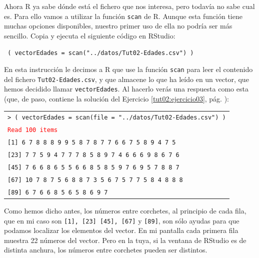 \documentclass[10pt,a4paper]{article}\usepackage[]{graphicx}\usepackage[]{color}
\newcounter {cont01}
\begin{document}
%

Ahora R ya sabe dónde está el fichero que nos interesa, pero todavía no sabe cual es. Para ello vamos a utilizar la función {\tt scan} de R. Aunque esta función tiene muchas opciones disponibles, nuestro primer uso de ella no podría ser más sencillo. Copia y ejecuta el siguiente código en RStudio:
\begin{center}
\begin{minipage}{10cm}
{\tt
( vectorEdades = scan("../datos/Tut02-Edades.csv") )
}
\end{minipage}
\end{center}
En esta instrucción le decimos a R que use la función {\tt scan} para leer el contenido del fichero {\tt Tut02-Edades.csv}, y que almacene lo que ha leído en un vector, que hemos decidido llamar {\tt vectorEdades}.
Al hacerlo verás una respuesta como esta (que, de paso, contiene la solución del Ejercicio \ref{tut02:ejercicio03}, pág. \pageref{tut02:ejercicio03}):
\begin{center}
\begin{tabular}{l}
{\tt > ( vectorEdades = scan(file = "../datos/Tut02-Edades.csv") )}\\
\textcolor{red}{\tt Read 100 items{}}\\
{\tt   [1]  6  7  8  8  8  9  9  5  8  7  8  7  7  6  6  7  5  8  9  4  7  5 }\\
{\tt  [23]  7  7  5  9  4  7  7  7  8  5  8  9  7  4  6  6  6  9  8  6  7  6 }\\
{\tt  [45]  7  6  6  8  6  5  5  6  6  8  5  8  5  9  7  6  9  5  7  8  8  7 }\\
{\tt  [67] 10  7  8  7  5  6  8  8  7  3  5  6  7  5  7  7  5  8  4  8  8  8 }\\
{\tt  [89]  6  7  6  6  8  5  6  5  8  6  9  7 }
\end{tabular}
\end{center}
Como hemos dicho antes, los números entre corchetes, al principio de cada fila, que en mi caso son {\tt [1], [23]  [45], [67]} y {\tt [89]}, son sólo ayudas para que podamos localizar los elementos del vector. En mi pantalla cada primera fila muestra 22 números del vector. Pero en la tuya, si la ventana de RStudio es de distinta anchura, los números entre corchetes pueden ser distintos.\\
\end{document}
